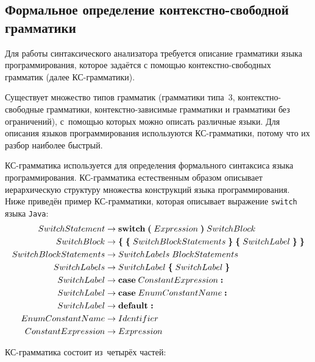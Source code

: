 \subsection{Формальное определение контекстно-свободной грамматики} \label{sub114}

Для работы синтаксического анализатора требуется описание грамматики языка программирования, которое задаётся с помощью контекстно-свободных грамматик (далее КС-грамматики).

Существует множество типов грамматик (грамматики типа~3, контекстно-свободные грамматики, контекстно-зависимые грамматики и грамматики без ограничений), с~помощью которых можно описать различные языки. Для описания языков программирования используются КС-грамматики, потому что их разбор наиболее быстрый.

КС-грамматика используется для определения формального синтаксиса языка программирования. КС-грамматика естественным образом описывает иерархическую структуру множества конструкций языка программирования. Ниже приведён пример КС-грамматики, которая описывает выражение \texttt{switch} языка \texttt{Java}:
\begin{align*}
SwitchStatement &\to \textbf{switch}\;\textbf{(}\; Expression\; \textbf{)}\; SwitchBlock \\
SwitchBlock &\to \textbf{\{}\; \textbf{\{}\;SwitchBlockStatements\;\textbf{\}}\; \textbf{\{}\;SwitchLabel\;\textbf{\}}\; \textbf{\}} \\
SwitchBlockStatements &\to SwitchLabels\; BlockStatements \\
SwitchLabels &\to SwitchLabel\; \textbf{\{}\;SwitchLabel\;\textbf{\}} \\
SwitchLabel &\to \textbf{case}\; ConstantExpression\; \textbf{:} \\
SwitchLabel &\to \textbf{case}\; EnumConstantName \;\textbf{:} \\
SwitchLabel &\to \textbf{default\;:} \\
EnumConstantName &\to Identifier \\
ConstantExpression &\to Expression
\end{align*}

КС-грамматика состоит из~четырёх частей:
 
